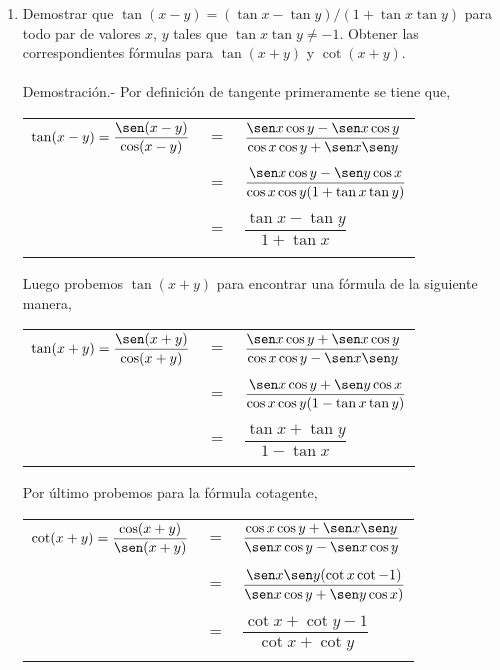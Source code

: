 \begin{enumerate}
\begin{enumerate}[\bfseries (a)]
\end{enumerate}

\item Demostrar que $\tan(x-y)=(\tan x-\tan y)/(1+\tan x\tan y)$ para todo par de valores $x$, $y$ tales que $\tan x \tan y \neq -1$. Obtener las correspondientes fórmulas para $\tan(x+y)$ y $\cot(x+y)$.\\\\
    Demostración.-\; Por definición de tangente primeramente se tiene que, 
    \begin{center}
	\begin{tabular}{rcl}
	    $\tan(x-y)=\dfrac{\sen(x-y)}{\cos(x-y)}$&$=$&$\dfrac{\sen x \cos y - \sen x \cos y}{\cos x \cos y + \sen x \sen y}$\\\\
	    &$=$&$\dfrac{\sen x \cos y - \sen y \cos x}{\cos x \cos y(1+\tan x \tan y)}$\\\\
	    &$=$&$\dfrac{\tan x- \tan y}{1 + \tan x}$\\\\
	\end{tabular}
    \end{center}
    Luego probemos $\tan (x+y)$ para encontrar una fórmula de la siguiente manera,
    \begin{center}
	\begin{tabular}{rcl}
	    $\tan(x+y)=\dfrac{\sen(x+y)}{\cos(x+y)}$&$=$&$\dfrac{\sen x \cos y + \sen x \cos y}{\cos x \cos y - \sen x \sen y}$\\\\
	    &$=$&$\dfrac{\sen x \cos y + \sen y \cos x}{\cos x \cos y(1-\tan x \tan y)}$\\\\
	    &$=$&$\dfrac{\tan x + \tan y}{1 - \tan x}$\\\\
	\end{tabular}
    \end{center}
    Por último probemos para la fórmula cotagente,
    \begin{center}
	\begin{tabular}{rcl}
	    $\cot(x+y)=\dfrac{\cos(x+y)}{\sen(x+y)}$&$=$&$\dfrac{\cos x \cos y + \sen x \sen y}{\sen x \cos y - \sen x \cos y}$\\\\
	    &$=$&$\dfrac{\sen x \sen y (\cot x \cot - 1)}{\sen x \cos y + \sen y \cos x)}$\\\\
	    &$=$&$\dfrac{\cot x + \cot y - 1}{\cot x + \cot y}$\\\\
	\end{tabular}
    \end{center}


\end{enumerate}
